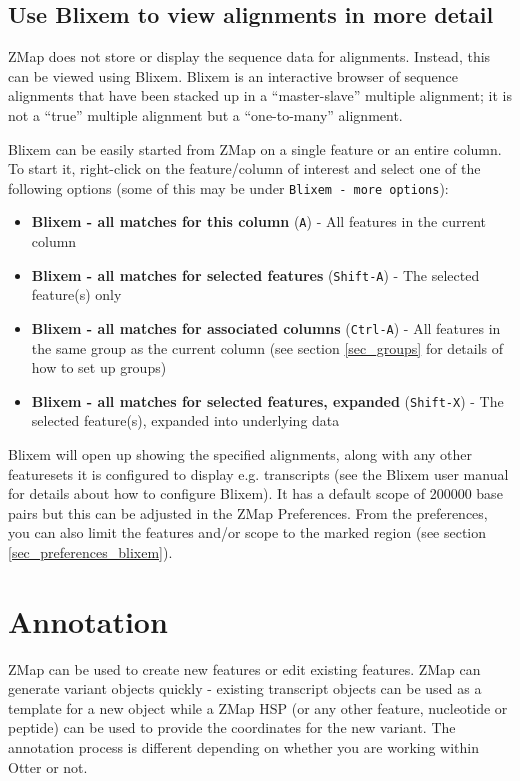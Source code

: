 \documentclass[letterpaper]{article}
\begin{document}
\subsection{Use Blixem to view alignments in more detail} \label{sec_blixem}
ZMap does not store or display the sequence data for alignments. Instead, this can be viewed using Blixem. Blixem is an interactive browser of sequence alignments that have been stacked up in a ``master-slave'' multiple alignment; it is not a ``true'' multiple alignment but a ``one-to-many'' alignment.

Blixem can be easily started from ZMap on a single feature or an entire column. To start it, right-click on the feature/column of interest and select one of the following options (some of this may be under \lstinline{Blixem - more options}):
\begin{itemize}
\item \textbf{Blixem - all matches for this column} (\lstinline{A}) - All features in the current column
\item \textbf{Blixem - all matches for selected features} (\lstinline{Shift-A}) - The selected feature(s) only
\item \textbf{Blixem - all matches for associated columns} (\lstinline{Ctrl-A}) - All features in the same group as the current column (see section \ref{sec_groups} for details of how to set up groups)
\item \textbf{Blixem - all matches for selected features, expanded} (\lstinline{Shift-X}) - The selected feature(s), expanded into underlying data
\end{itemize}

Blixem will open up showing the specified alignments, along with any other featuresets it is configured to display e.g. transcripts (see the Blixem user manual for details about how to configure Blixem). It has a default scope of 200000 base pairs but this can be adjusted in the ZMap Preferences. From the preferences, you can also limit the features and/or scope to the marked region (see section \ref{sec_preferences_blixem}).


\clearpage
\section{Annotation} \label{sec_annotation}
ZMap can be used to create new features or edit existing features. ZMap can generate variant objects quickly - existing transcript objects can be used as a template for a new object while a ZMap HSP (or any other feature, nucleotide or peptide) can be used to provide the coordinates for the new variant. The annotation process is different depending on whether you are working within Otter or not.
\end{document}
